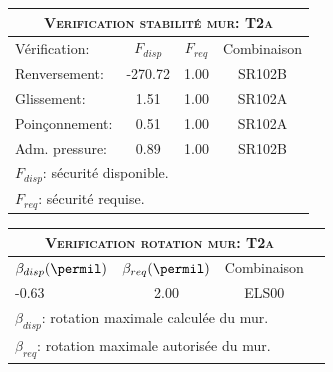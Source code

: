 \begin{center}
\begin{tabular}[H]{|l|c|c|c|}
\hline
\multicolumn{4}{|c|}{\textsc{Verification stabilité mur: T2a}}\\
\hline
Vérification:  & $F_{disp}$ & $F_{req}$ & Combinaison\\
\hline
Renversement:  & -270.72 & 1.00 & SR102B\\
Glissement:  & 1.51 & 1.00 & SR102A\\
Poinçonnement:  & 0.51 & 1.00 & SR102A\\
Adm. pressure:  & 0.89 & 1.00 & SR102B\\
\hline
\multicolumn{4}{|l|}{$F_{disp}$: sécurité disponible.}\\
\multicolumn{4}{|l|}{$F_{req}$: sécurité requise.}\\
\hline
\end{tabular}
\end{center}
\begin{center}
\begin{tabular}[H]{|l|c|c|c|}
\hline
\multicolumn{3}{|c|}{\textsc{Verification rotation mur: T2a}}\\
\hline
$\beta_{disp} (\permil)$ & $\beta_{req}(\permil)$ & Combinaison\\
\hline
-0.63 & 2.00 & ELS00\\
\hline
\multicolumn{3}{|l|}{$\beta_{disp}$: rotation maximale calculée du mur.}\\
\multicolumn{3}{|l|}{$\beta_{req}$: rotation maximale autorisée du mur.}\\
\hline
\end{tabular}
\end{center}
 \label{tb_T2a}
\tablelasttail{\hline}
